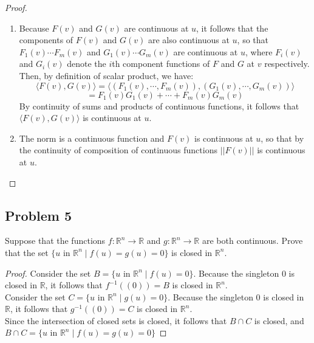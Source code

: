 \documentclass{article}
\begin{document}
\begin{proof}
\begin{enumerate}[label = \alph*)]
    \item Because $F(v)$ and $G(v)$ are continuous at $u$, it follows that the components of $F(v)$ and $G(v)$ are also continuous at $u$, so that $F_1(v)\cdots F_m(v)$ and $G_1(v)\cdots G_m(v)$ are continuous at $u$, where $F_i(v)$ and $G_i(v)$ denote the $i$th component functions of $F$ and $G$ at $v$ respectively. Then, by definition of scalar product, we have:
    \[ \langle F(v), G(v) \rangle = \langle (F_1(v),\cdots, F_m(v)), (G_1(v),\cdots, G_m(v))\rangle\]
    \[ = F_1(v)G_1(v) + \cdots + F_m(v)G_m(v)\]
    By continuity of sums and products of continuous functions, it follows that $\langle F(v), G(v) \rangle$ is continuous at $u$.
    \item The norm is a continuous function and $F(v)$ is continuous at $u$, so that by the continuity of composition of continuous functions $||F(v)||$ is continuous at $u$.
    
\end{enumerate}

\end{proof}

\subsection*{Problem 5}
Suppose that the functions $f \colon \mathbb{R}^n \to \mathbb{R}$ and $g \colon \mathbb{R}^n \to \mathbb{R}$ are both continuous. Prove that the set $\{u \text{ in } \mathbb{R}^n \mid f(u) = g(u) = 0\}$ is closed in $\mathbb{R}^n$.

\begin{proof}

Consider the set $B = \{u \text{ in } \mathbb{R}^n \mid f(u) = 0\}$. Because the singleton 0 is closed in $\mathbb{R}$, it follows that $f^{-1}((0)) = B$ is closed in $\mathbb{R}^n$. \\

Consider the set $C = \{u \text{ in } \mathbb{R}^n \mid g(u) = 0\}$. Because the singleton 0 is closed in $\mathbb{R}$, it follows that $g^{-1}((0)) = C$ is closed in $\mathbb{R}^n$. \\

Since the intersection of closed sets is closed, it follows that $B \cap C$ is closed, and $B \cap C = \{u \text{ in } \mathbb{R}^n \mid f(u) = g(u) = 0\}$

\end{proof}
\end{document}
